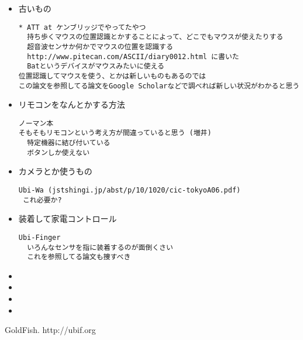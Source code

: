 \begin{itemize}
\item 古いもの

\begin{verbatim}
* ATT at ケンブリッジでやってたやつ
  持ち歩くマウスの位置認識とかすることによって、どこでもマウスが使えたりする
  超音波センサか何かでマウスの位置を認識する
  http://www.pitecan.com/ASCII/diary0012.html に書いた
  Batというデバイスがマウスみたいに使える
位置認識してマウスを使う、とかは新しいものもあるのでは
この論文を参照してる論文をGoogle Scholarなどで調べれば新しい状況がわかると思う
\end{verbatim}

\item リモコンをなんとかする方法

\begin{verbatim}
ノーマン本
そもそもリモコンという考え方が間違っていると思う (増井)
  特定機器に結び付いている
  ボタンしか使えない
\end{verbatim}

\item カメラとか使うもの

\begin{verbatim}
Ubi-Wa (jstshingi.jp/abst/p/10/1020/cic-tokyoA06.pdf)
 これ必要か?
\end{verbatim}

\item 装着して家電コントロール
\begin{verbatim}
Ubi-Finger
  いろんなセンサを指に装着するのが面倒くさい
  これを参照してる論文も捜すべき
\end{verbatim}

\item 
\item 
\item 
\item 
\end{itemize}

\begin{thebibliography}{10}

GoldFish. http://ubif.org

\end{thebibliography}

